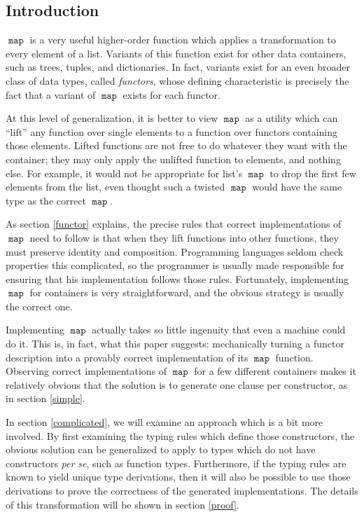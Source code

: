 \documentclass{article}
\newcommand{\map}{\ensuremath{\mathop{\mathtt{map}}}}
\begin{document}
\begin{multicols}{2}
\section{Introduction}\label{intro}
\vspace{-\parskip}\hspace*{\parindent}$\map$ is a very useful higher-order function which applies a transformation to every element of a list. Variants of this function exist for other data containers, such as trees, tuples, and dictionaries. In fact, variants exist for an even broader class of data types, called \emph{functors}, whose defining characteristic is precisely the fact that a variant of $\map$ exists for each functor.

At this level of generalization, it is better to view $\map$ as a utility which can ``lift'' any function over single elements to a function over functors containing those elements. Lifted functions are not free to do whatever they want with the container; they may only apply the unlifted function to elements, and nothing else. For example, it would not be appropriate for list's $\map$ to drop the first few elements from the list, even thought such a twisted $\map$ would have the same type as the correct $\map$.

As section \ref{functor} explains, the precise rules that correct implementations of $\map$ need to follow is that when they lift functions into other functions, they must preserve identity and composition. Programming languages seldom check properties this complicated, so the programmer is usually made responsible for ensuring that his implementation follows those rules. Fortunately, implementing $\map$ for containers is very straightforward, and the obvious strategy is usually the correct one.

Implementing $\map$ actually takes so little ingenuity that even a machine could do it. This is, in fact, what this paper suggests: mechanically turning a functor description into a provably correct implementation of its $\map$ function. Observing correct implementations of $\map$ for a few different containers makes it relatively obvious that the solution is to generate one clause per constructor, as in section \ref{simple}.

In section \ref{complicated}, we will examine an approach which is a bit more involved. By first examining the typing rules which define those constructors, the obvious solution can be generalized to apply to types which do not have constructors \emph{per se}, such as function types. Furthermore, if the typing rules are known to yield unique type derivations, then it will also be possible to use those derivations to prove the correctness of the generated implementations. The details of this transformation will be shown in section \ref{proof}.


\end{multicols}
\end{document}
